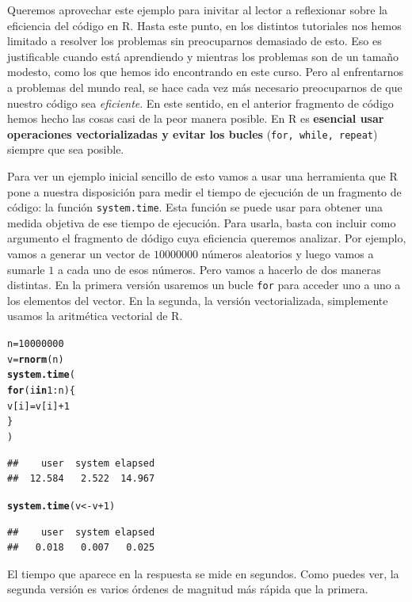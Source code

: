\documentclass[10pt,a4paper]{article}\usepackage[]{graphicx}\usepackage[]{color}
\makeatletter
\newcommand{\hlnum}[1]{\textcolor[rgb]{0.686,0.059,0.569}{#1}}%
\newcommand{\hlopt}[1]{\textcolor[rgb]{0,0,0}{#1}}%
\newcommand{\hlstd}[1]{\textcolor[rgb]{0.345,0.345,0.345}{#1}}%
\newcommand{\hlkwa}[1]{\textcolor[rgb]{0.161,0.373,0.58}{\textbf{#1}}}%
\newcommand{\hlkwb}[1]{\textcolor[rgb]{0.69,0.353,0.396}{#1}}%
\newcommand{\hlkwd}[1]{\textcolor[rgb]{0.737,0.353,0.396}{\textbf{#1}}}%
\newenvironment{kframe}{%
 \def\at@end@of@kframe{}%
 \ifinner\ifhmode%
  \def\at@end@of@kframe{\end{minipage}}%
  \begin{minipage}{\columnwidth}%
 \fi\fi%
 \def\FrameCommand##1{\hskip\@totalleftmargin \hskip-\fboxsep
 \colorbox{shadecolor}{##1}\hskip-\fboxsep
     \hskip-\linewidth \hskip-\@totalleftmargin \hskip\columnwidth}%
 \MakeFramed {\advance\hsize-\width
   \@totalleftmargin\z@ \linewidth\hsize
   \@setminipage}}%
 {\par\unskip\endMakeFramed%
 \at@end@of@kframe}
\newenvironment{knitrout}{}{} %
\newcounter {cont01}
\makeatother
\begin{document}
Queremos aprovechar este ejemplo para inivitar al lector a reflexionar sobre la eficiencia del código en R. Hasta este punto, en los distintos tutoriales nos hemos limitado a resolver los problemas sin preocuparnos demasiado de esto. Eso es justificable cuando está aprendiendo y mientras los problemas son de un tamaño modesto, como los que hemos ido encontrando en este curso. Pero al enfrentarnos a problemas del mundo real, se hace cada vez más necesario preocuparnos de que nuestro código sea {\em eficiente}. En este sentido, en el anterior fragmento de código hemos hecho las cosas casi de la peor manera posible. En R es {\bf esencial usar operaciones vectorializadas y evitar los bucles} ({\tt for, while, repeat}) siempre que sea posible.

Para ver un ejemplo inicial sencillo de esto vamos a usar una herramienta que R pone a nuestra disposición para medir el tiempo de ejecución de un fragmento de código: la función {\tt system.time}. Esta función se puede usar para obtener una medida objetiva de ese tiempo de ejecución. Para usarla, basta con incluir como argumento el fragmento de dódigo cuya eficiencia queremos analizar. Por ejemplo, vamos a generar un vector de $10000000$ números aleatorios y luego vamos a sumarle $1$ a cada uno de esos números. Pero vamos a hacerlo de dos maneras distintas. En la primera versión usaremos un bucle {\tt for} para acceder uno a uno a los elementos del vector. En la segunda, la versión vectorializada, simplemente usamos la aritmética vectorial de R.
\begin{knitrout}
\color{fgcolor}\begin{kframe}
\begin{alltt}
\hlstd{n} \hlkwb{=} \hlnum{10000000}
\hlstd{v} \hlkwb{=} \hlkwd{rnorm}\hlstd{(n)}
\hlkwd{system.time}\hlstd{(}
  \hlkwa{for} \hlstd{(i} \hlkwa{in} \hlnum{1}\hlopt{:}\hlstd{n)\{}
    \hlstd{v[i]} \hlkwb{=} \hlstd{v[i]} \hlopt{+} \hlnum{1}
  \hlstd{\}}
\hlstd{)}
\end{alltt}
\begin{verbatim}
##    user  system elapsed 
##  12.584   2.522  14.967
\end{verbatim}
\begin{alltt}
\hlkwd{system.time}\hlstd{(v} \hlkwb{<-} \hlstd{v} \hlopt{+}\hlnum{1}\hlstd{)}
\end{alltt}
\begin{verbatim}
##    user  system elapsed 
##   0.018   0.007   0.025
\end{verbatim}
\end{kframe}
\end{knitrout}
El tiempo que aparece en la respuesta se mide en segundos. Como puedes ver, la segunda versión es varios órdenes de magnitud más rápida que la primera.
\end{document}

